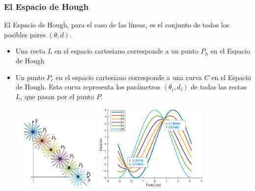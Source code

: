 \begin{frame}\frametitle{El Espacio de Hough}
  El Espacio de Hough, para el caso de las líneas, es el conjunto de todos los posibles pares $(\theta, d)$.
  \begin{itemize}
  \item Una recta $L$ en el espacio cartesiano corresponde a un punto $P_h$ en el Espacio de Hough
  \item Un punto $P_c$ en el espacio cartesiano corresponde a una curva $C$ en el Espacio de Hough. Esta curva representa los parámetros $(\theta_i, d_i)$ de todas las rectas $L_i$ que pasan por el punto $P$.
  \end{itemize}
  \begin{figure}
    \centering
    \includegraphics[width=0.35\textwidth]{Figuras/Hough1.pdf}
    \includegraphics[width=0.5\textwidth]{Figuras/Hough1.eps}
  \end{figure}
\end{frame}

